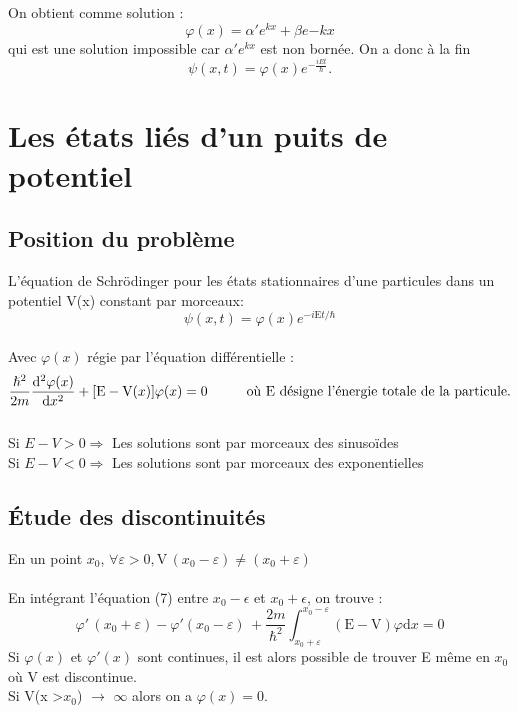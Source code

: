 \documentclass[11pt]{report}
\begin{document}
On obtient comme solution : \begin{equation} \varphi(x) = \alpha' e^{kx} + \beta e{-kx} \nonumber \end{equation} qui est une solution impossible car  $\alpha' e^{kx}$ est non bornée. On a donc à la fin \begin{equation} \psi(x,t) = \varphi(x) e^{-\frac{iEt}{\hbar}} . \end{equation}

\section{Les états liés d'un puits de potentiel}
\subsection{Position du problème}

L'équation de Schrödinger pour les états stationnaires d'une particules dans un potentiel V(x) constant par morceaux:
\begin{equation}
    \psi(x,t) = \varphi(x)e^{-i\mathrm{E}t/\hbar}
\end{equation} \\
Avec  $\varphi(x)$ régie par l'équation différentielle :
\begin{equation}
     \dfrac{\hslash^2}{2m}  \dfrac{\mathrm{d}^2 \varphi(x)}{\mathrm{d} x^2} + [\mathrm{E} -\mathrm{V}(x)]\varphi(x) = 0 \hspace*{1cm} \textrm{où E désigne l'énergie totale de la particule.}
\end{equation}\\
Si $E-V > 0 \Rightarrow$ Les solutions sont par morceaux des sinusoïdes\\
Si $E-V < 0 \Rightarrow$ Les solutions sont par morceaux des exponentielles\\

\subsection{Étude des discontinuités}
En un point $x_0$, $\forall\varepsilon > 0,\mathrm{V} \,(x_0 - \varepsilon) \neq (x_0 + \varepsilon)$\\\\
En intégrant l'équation (7) entre $x_0 - \epsilon$ et $x_0 + \epsilon$, on trouve :
\begin{equation}
    \varphi'\, (x_0 + \varepsilon) - \varphi'(x_0 - \varepsilon)\, + \dfrac{2m}{\hbar^{2}} \int_{x_0 + \varepsilon}^{x_0 - \varepsilon} (\mathrm{E} - \mathrm{V})\varphi \mathrm{d}x = 0
\end{equation}
Si $\varphi(x)$ et $\varphi'(x)$ sont continues, il est alors possible de trouver E même en $x_0$ où V est discontinue.\\
Si V(x >$x_0$) $\rightarrow$ $\infty$ alors on a $\varphi(x) = 0$.
\end{document}
